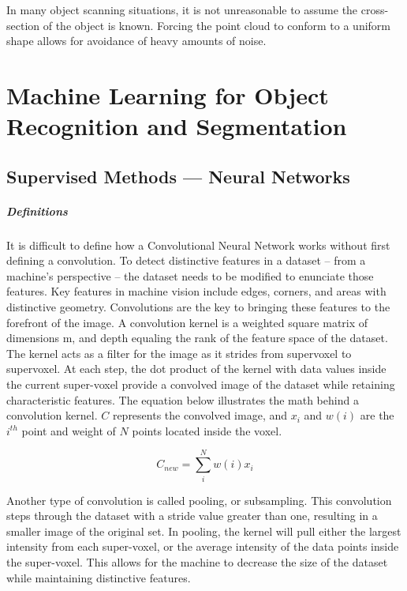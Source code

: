 \documentclass[12pt]{drexelthesis}
\let\Oldsection\section
\renewcommand{\section}{\FloatBarrier\Oldsection}
\let\Oldsubsection\subsection
\renewcommand{\subsection}{\FloatBarrier\Oldsubsection}
\begin{document}
In many object scanning situations, it is not unreasonable to assume the cross-section of the object is known. Forcing the point cloud to conform to a uniform shape allows for avoidance of heavy amounts of noise.




 


\section{Machine Learning for Object Recognition and Segmentation}
\label{sec:machinelearning}
\subsection{Supervised Methods --- Neural Networks}
\subparagraph{Definitions}
It is difficult to define how a Convolutional Neural Network works without first defining a convolution. To detect distinctive features in a dataset – from a machine’s perspective – the dataset needs to be modified to enunciate those features. Key features in machine vision include edges, corners, and areas with distinctive geometry. Convolutions are the key to bringing these features to the forefront of the image.
A convolution kernel is a weighted square matrix of dimensions m, and depth equaling the rank of the feature space of the dataset. The kernel acts as a filter for the image as it strides from supervoxel to supervoxel. At each step, the dot product of the kernel with data values inside the current super-voxel provide a convolved image of the dataset while retaining characteristic features. The equation below illustrates the math behind a convolution kernel. $C$ represents the convolved image, and $x_{i}$ and $w(i)$ are the $i^{th}$ point and weight of $N$ points located inside the voxel.

\begin{equation}
	C_{new} = \sum_{i}^{N}  w(i) x_{i}
\end{equation}

Another type of convolution is called pooling, or subsampling. This convolution steps through the dataset with a stride value greater than one, resulting in a smaller image of the original set. In pooling, the kernel will pull either the largest intensity from each super-voxel, or the average intensity of the data points inside the super-voxel. This allows for the machine to decrease the size of the dataset while maintaining distinctive features.
\end{document}

